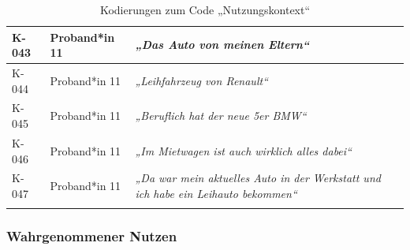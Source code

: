 {\begin{xltabular}{\textwidth}{
    |P{0.10\textwidth}
    |P{0.17\textwidth}
    |Y|
}
\hline
K-043 & Proband*in 11 & \textit{„Das Auto von meinen Eltern“} \\
\hline
K-044 & Proband*in 11 & \textit{„Leihfahrzeug von Renault“} \\
\hline
K-045 & Proband*in 11 & \textit{„Beruflich hat der neue 5er BMW“} \\
\hline
K-046 & Proband*in 11 & \textit{„Im Mietwagen ist auch wirklich alles dabei“} \\
\hline
K-047 & Proband*in 11 & \textit{„Da war mein aktuelles Auto in der Werkstatt und ich habe ein Leihauto bekommen“} \\
\hline
\caption{Kodierungen zum Code „Nutzungskontext“}\label{tab:kodiernachweis-nutzungskontext}\\
\end{xltabular}
}

\clearpage
\subsubsection{Wahrgenommener Nutzen}

